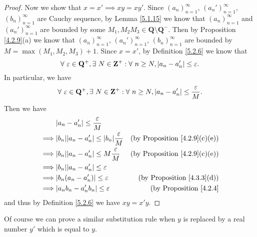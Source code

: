 \begin{proof}
    Now we show that \(x = x' \implies xy = xy'\).
    Since \((a_n)_{n = 1}^\infty\), \((a_n')_{n = 1}^\infty\), \((b_n)_{n = 1}^\infty\) are Cauchy sequence, by Lemma \ref{5.1.15} we know that \((a_n)_{n = 1}^\infty\) and \((a_n')_{n = 1}^\infty\) are bounded by some \(M_1, M_2 M_3 \in \mathbf{Q} \setminus \mathbf{Q}^-\).
    Then by Proposition \ref{4.2.9}(a) we know that \((a_n)_{n = 1}^\infty\), \((a_n')_{n = 1}^\infty\), \((b_n)_{n = 1}^\infty\) are bounded by \(M = \max(M_1, M_2, M_3) + 1\).
    Since \(x = x'\), by Definition \ref{5.2.6} we know that
    \[
        \forall\ \varepsilon \in \mathbf{Q}^+, \exists\ N \in \mathbf{Z}^+ : \forall\ n \geq N, \abs*{a_n - a_n'} \leq \varepsilon.
    \]
    In particular, we have
    \[
        \forall\ \varepsilon \in \mathbf{Q}^+, \exists\ N \in \mathbf{Z}^+ : \forall\ n \geq N, \abs*{a_n - a_n'} \leq \frac{\varepsilon}{M}.
    \]
    Then we have
    \begin{align*}
                 & \abs*{a_n - a_n'} \leq \frac{\varepsilon}{M}                                                                   \\
        \implies & \abs*{b_n} \abs*{a_n - a_n'} \leq \abs*{b_n} \frac{\varepsilon}{M} & \text{(by Proposition \ref{4.2.9}(c)(e))} \\
        \implies & \abs*{b_n} \abs*{a_n - a_n'} \leq M \frac{\varepsilon}{M}          & \text{(by Proposition \ref{4.2.9}(c)(e))} \\
        \implies & \abs*{b_n} \abs*{a_n - a_n'} \leq \varepsilon                                                                  \\
        \implies & \abs*{b_n (a_n - a_n')} \leq \varepsilon                           & \text{(by Proposition \ref{4.3.3}(d))}    \\
        \implies & \abs*{a_n b_n - a_n' b_n} \leq \varepsilon                         & \text{(by Proposition \ref{4.2.4}}
    \end{align*}
    and thus by Definition \ref{5.2.6} we have \(xy = x'y\).
\end{proof}

\begin{note}
    Of course we can prove a similar substitution rule when \(y\) is replaced by a real number \(y'\) which is equal to \(y\).
\end{note}

